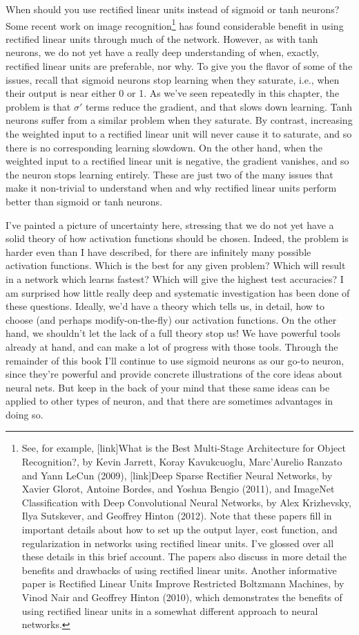 \documentclass[a4paper,twoside,10pt]{book}
\begin{document}
When should you use rectified linear units instead of sigmoid or tanh neurons? Some recent work on image recognition\footnote{See, for example, [link]What is the Best Multi-Stage Architecture for Object Recognition?, by Kevin Jarrett, Koray Kavukcuoglu, Marc'Aurelio Ranzato and Yann LeCun (2009), [link]Deep Sparse Rectiﬁer Neural Networks, by Xavier Glorot, Antoine Bordes, and Yoshua Bengio (2011), and ImageNet Classification with Deep Convolutional Neural Networks, by Alex Krizhevsky, Ilya Sutskever, and Geoffrey Hinton (2012). Note that these papers fill in important details about how to set up the output layer, cost function, and regularization in networks using rectified linear units. I've glossed over all these details in this brief account. The papers also discuss in more detail the benefits and drawbacks of using rectified linear units. Another informative paper is Rectified Linear Units Improve Restricted Boltzmann Machines, by Vinod Nair and Geoffrey Hinton (2010), which demonstrates the benefits of using rectified linear units in a somewhat different approach to neural networks.} has found considerable benefit in using rectified linear units through much of the network. However, as with tanh neurons, we do not yet have a really deep understanding of when, exactly, rectified linear units are preferable, nor why. To give you the flavor of some of the issues, recall that sigmoid neurons stop learning when they saturate, i.e., when their output is near either 0 or 1. As we've seen repeatedly in this chapter, the problem is that $\sigma'$ terms reduce the gradient, and that slows down learning. Tanh neurons suffer from a similar problem when they saturate. By contrast, increasing the weighted input to a rectified linear unit will never cause it to saturate, and so there is no corresponding learning slowdown. On the other hand, when the weighted input to a rectified linear unit is negative, the gradient vanishes, and so the neuron stops learning entirely. These are just two of the many issues that make it non-trivial to understand when and why rectified linear units perform better than sigmoid or tanh neurons.

I've painted a picture of uncertainty here, stressing that we do not yet have a solid theory of how activation functions should be chosen. Indeed, the problem is harder even than I have described, for there are infinitely many possible activation functions. Which is the best for any given problem? Which will result in a network which learns fastest? Which will give the highest test accuracies? I am surprised how little really deep and systematic investigation has been done of these questions. Ideally, we'd have a theory which tells us, in detail, how to choose (and perhaps modify-on-the-fly) our activation functions. On the other hand, we shouldn't let the lack of a full theory stop us! We have powerful tools already at hand, and can make a lot of progress with those tools. Through the remainder of this book I'll continue to use sigmoid neurons as our go-to neuron, since they're powerful and provide concrete illustrations of the core ideas about neural nets. But keep in the back of your mind that these same ideas can be applied to other types of neuron, and that there are sometimes advantages in doing so.
\end{document}
